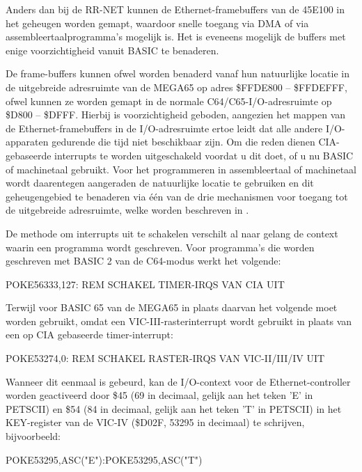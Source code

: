Anders dan bij de RR-NET kunnen de Ethernet-framebuffers van de 45E100 in het geheugen worden gemapt, waardoor snelle toegang via DMA of via assembleertaalprogramma's mogelijk is.  Het is eveneens mogelijk de buffers met enige voorzichtigheid vanuit BASIC te benaderen.

De frame-buffers kunnen ofwel worden benaderd vanaf hun natuurlijke locatie in de uitgebreide adresruimte van de MEGA65 op adres \$FFDE800 -- \$FFDEFFF, ofwel kunnen ze worden gemapt in de normale C64/C65-I/O-adresruimte op \$D800 -- \$DFFF.  Hierbij is voorzichtigheid geboden, aangezien het mappen van de Ethernet-framebuffers in de I/O-adresruimte ertoe leidt dat alle andere I/O-apparaten gedurende die tijd niet beschikbaar zijn.  Om die reden dienen CIA-gebaseerde interrupts te worden uitgeschakeld voordat u dit doet, of u nu BASIC of machinetaal gebruikt.  Voor het programmeren in assembleertaal of machinetaal wordt daarentegen aangeraden de natuurlijke locatie te gebruiken en dit geheugengebied te benaderen via één van de drie mechanismen voor toegang tot de uitgebreide adresruimte, welke worden beschreven in .

De methode om interrupts uit te schakelen verschilt al naar gelang de context waarin een programma wordt geschreven.  Voor programma's die worden geschreven met BASIC 2 van de C64-modus werkt het volgende:

\begin{screencode}
  POKE56333,127: REM SCHAKEL TIMER-IRQS VAN CIA UIT
\end{screencode}

Terwijl voor BASIC 65 van de MEGA65 in plaats daarvan het volgende moet worden gebruikt, omdat een VIC-III-rasterinterrupt wordt gebruikt in plaats van een op CIA gebaseerde timer-interrupt:

\begin{screencode}
POKE53274,0: REM SCHAKEL RASTER-IRQS VAN VIC-II/III/IV UIT
\end{screencode}

Wanneer dit eenmaal is gebeurd, kan de I/O-context voor de Ethernet-controller worden geactiveerd door \$45 (69 in decimaal, gelijk aan het teken 'E' in PETSCII) en \$54 (84 in decimaal, gelijk aan het teken 'T' in PETSCII) in het KEY-register van de VIC-IV (\$D02F, 53295 in decimaal) te schrijven, bijvoorbeeld:

\begin{screencode}
POKE53295,ASC("E"):POKE53295,ASC("T")
\end{screencode}

